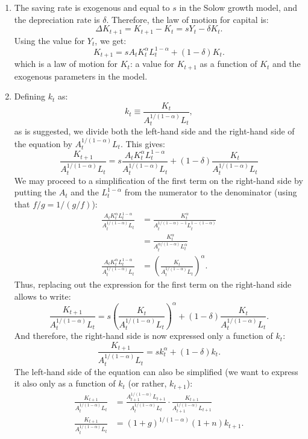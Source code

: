 \documentclass[]{book}
\theoremstyle{definition}
\theoremstyle{definition}
\theoremstyle{definition}
\theoremstyle{remark}
\begin{document}
\begin{enumerate}
\def\labelenumi{\arabic{enumi}.}
\item
  The saving rate is exogenous and equal to \(s\) in the Solow growth
  model, and the depreciation rate is \(\delta\). Therefore, the law of
  motion for capital is: \[\Delta K_{t+1}=K_{t+1}-K_t=sY_t-\delta K_t.\]
  Using the value for \(Y_t\), we get:
  \[\boxed{K_{t+1}=s A_t K_t^{\alpha} L_t^{1-\alpha} + (1-\delta) K_t}.\]
  which is a law of motion for \(K_t\): a value for \(K_{t+1}\) as a
  function of \(K_t\) and the exogenous parameters in the model.
\item
  Defining \(k_t\) as: \[k_t\equiv\frac{K_t}{A_t^{1/(1-\alpha)} L_t},\]
  as is suggested, we divide both the left-hand side and the right-hand
  side of the equation by \(A_t^{1/(1-\alpha)} L_t\). This gives:
  \[\frac{K_{t+1}}{A_t^{1/(1-\alpha)} L_t}=s \frac{A_t K_t^{\alpha} L_t^{1-\alpha}}{A_t^{1/(1-\alpha)} L_t} + (1-\delta) \frac{K_t}{A_t^{1/(1-\alpha)} L_t}\]
  We may proceed to a simplification of the first term on the right-hand
  side by putting the \(A_t\) and the \(L_t^{1-\alpha}\) from the
  numerator to the denominator (using that \(f/g=1/(g/f)\)): \[
  \begin{aligned}
  \frac{A_t K_t^{\alpha} L_t^{1-\alpha}}{A_t^{1/(1-\alpha)} L_t}&=\frac{K_t^\alpha}{A_t^{1/(1-\alpha)-1}L_t^{1-(1-\alpha)}}\\
  &=\frac{K_t^\alpha}{A_t^{\alpha/(1-\alpha)}L_t^{\alpha}}\\
  \frac{A_t K_t^{\alpha} L_t^{1-\alpha}}{A_t^{1/(1-\alpha)} L_t}&=\left(\frac{K_t}{A_t^{1/(1-\alpha)}L_t}\right)^\alpha.
  \end{aligned}
  \] Thus, replacing out the expression for the first term on the
  right-hand side allows to write:
  \[\frac{K_{t+1}}{A_t^{1/(1-\alpha)} L_t}=s\left(\frac{K_t}{A_t^{1/(1-\alpha)}L_t}\right)^\alpha+(1-\delta)\frac{K_t}{A_t^{1/(1-\alpha)} L_t}.\]
  And therefore, the right-hand side is now expressed only a function of
  \(k_t\):
  \[\frac{K_{t+1}}{A_t^{1/(1-\alpha)} L_t}=sk_t^\alpha+(1-\delta)k_t.\]
  The left-hand side of the equation can also be simplified (we want to
  express it also only as a function of \(k_t\) (or rather,
  \(k_{t+1}\)): \[
  \begin{aligned}
  \frac{K_{t+1}}{A_t^{1/(1-\alpha)} L_t}&= \frac{A_{t+1}^{1/(1-\alpha)} L_{t+1}}{A_t^{1/(1-\alpha)} L_t} \cdot \frac{K_{t+1}}{A_{t+1}^{1/(1-\alpha)} L_{t+1}} \\
  \frac{K_{t+1}}{A_t^{1/(1-\alpha)} L_t}&=(1+g)^{1/(1-\alpha)}(1+n) k_{t+1}.

\end{aligned}\]
\end{enumerate}
\end{document}

